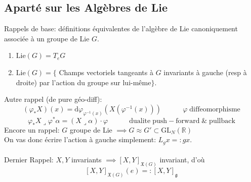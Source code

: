 \documentclass[a4paper,11pt]{article}
\renewcommand{\d}{{\mathrm{d}}}
\begin{document}
\subsection{Aparté sur les Algèbres de Lie}
Rappels de base: définitions équivalentes de l'algèbre de Lie canoniquement associée à un groupe de Lie $G$.
\begin{enumerate}
\item $\mathrm{Lie}(G) = T_e G$
\item $\mathrm{Lie}(G) = \{$ Champs vectoriels tangeants à $G$ invariants à gauche (resp à droite) par l'action du groupe sur lui-même$\}$.
\end{enumerate}
Autre rappel (de pure géo-diff):
$$(\varphi_* X) (x) = \d \varphi _{\varphi^{-1}(x)} (X(\varphi^{-1}(x))) \quad \quad \quad \varphi \; \mathrm{diffeomorphisme}$$
$$\varphi_* X \lrcorner \varphi^* \alpha = (X\lrcorner \alpha) \cdot \varphi \quad \quad \quad \mathrm{dualite}\;\mathrm{push}\!-\!\mathrm{forward}\;\&\;\mathrm{pullback}$$
Encore un rappel: $G$ groupe de Lie $\implies G \approx G' \subset \mathrm{GL}_N(\mathbb{R})$\\
On vas donc écrire l'action à gauche simplement: $L_g x =: g x$.\\ \\
Dernier Rappel: $X,Y$ invariants $\implies [X,Y]_{\mathfrak{X}(G)}$ invariant, d'où
$$[X,Y]_{\mathfrak{X}(G)} (e) =: [X,Y]_\mathfrak{g}$$
\end{document}
